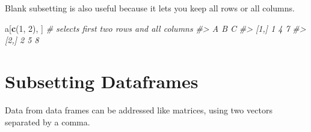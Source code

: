 \documentclass[]{book}
\newenvironment{Shaded}{\begin{snugshade}}{\end{snugshade}}
\newcommand{\CommentTok}[1]{\textcolor[rgb]{0.56,0.35,0.01}{\textit{#1}}}
\newcommand{\DecValTok}[1]{\textcolor[rgb]{0.00,0.00,0.81}{#1}}
\newcommand{\KeywordTok}[1]{\textcolor[rgb]{0.13,0.29,0.53}{\textbf{#1}}}
\newcommand{\NormalTok}[1]{#1}
\begin{document}
Blank subsetting is also useful because it lets you keep all rows or all columns.

\begin{Shaded}
\begin{Highlighting}[]
\NormalTok{a[}\KeywordTok{c}\NormalTok{(}\DecValTok{1}\NormalTok{, }\DecValTok{2}\NormalTok{), ] }\CommentTok{# selects first two rows and all columns}
\CommentTok{#>      A B C}
\CommentTok{#> [1,] 1 4 7}
\CommentTok{#> [2,] 2 5 8}
\end{Highlighting}
\end{Shaded}

\hypertarget{subsetting-dataframes}{%
\section{Subsetting Dataframes}\label{subsetting-dataframes}}

Data from data frames can be addressed like matrices, using two vectors separated by a comma.
\end{document}
